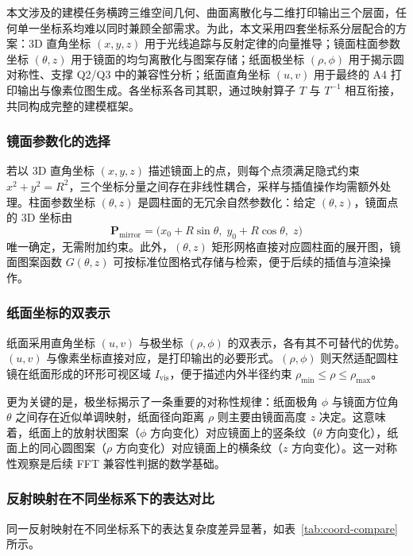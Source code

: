 \documentclass[12pt, a4paper]{ctexart}
\begin{document}
本文涉及的建模任务横跨三维空间几何、曲面离散化与二维打印输出三个层面，任何单一坐标系均难以同时兼顾全部需求。为此，本文采用四套坐标系分层配合的方案：3D 直角坐标 $(x,y,z)$ 用于光线追踪与反射定律的向量推导；镜面柱面参数坐标 $(\theta,z)$ 用于镜面的均匀离散化与图案存储；纸面极坐标 $(\rho,\phi)$ 用于揭示圆对称性、支撑 Q2/Q3 中的兼容性分析；纸面直角坐标 $(u,v)$ 用于最终的 A4 打印输出与像素位图生成。各坐标系各司其职，通过映射算子 $T$ 与 $T^{-1}$ 相互衔接，共同构成完整的建模框架。

\subsubsection{镜面参数化的选择}

若以 3D 直角坐标 $(x,y,z)$ 描述镜面上的点，则每个点须满足隐式约束 $x^2+y^2=R^2$，三个坐标分量之间存在非线性耦合，采样与插值操作均需额外处理。柱面参数坐标 $(\theta,z)$ 是圆柱面的无冗余自然参数化：给定 $(\theta,z)$，镜面点的 3D 坐标由
\[
\mathbf{P}_{\mathrm{mirror}}=\bigl(x_0+R\sin\theta,\;y_0+R\cos\theta,\;z\bigr)
\]
唯一确定，无需附加约束。此外，$(\theta,z)$ 矩形网格直接对应圆柱面的展开图，镜面图案函数 $G(\theta,z)$ 可按标准位图格式存储与检索，便于后续的插值与渲染操作。

\subsubsection{纸面坐标的双表示}

纸面采用直角坐标 $(u,v)$ 与极坐标 $(\rho,\phi)$ 的双表示，各有其不可替代的优势。$(u,v)$ 与像素坐标直接对应，是打印输出的必要形式。$(\rho,\phi)$ 则天然适配圆柱镜在纸面形成的环形可视区域 $I_{\mathrm{vis}}$，便于描述内外半径约束 $\rho_{\min}\leq\rho\leq\rho_{\max}$。

更为关键的是，极坐标揭示了一条重要的对称性规律：纸面极角 $\phi$ 与镜面方位角 $\theta$ 之间存在近似单调映射，纸面径向距离 $\rho$ 则主要由镜面高度 $z$ 决定。这意味着，纸面上的放射状图案（$\phi$ 方向变化）对应镜面上的竖条纹（$\theta$ 方向变化），纸面上的同心圆图案（$\rho$ 方向变化）对应镜面上的横条纹（$z$ 方向变化）。这一对称性观察是后续 FFT 兼容性判据的数学基础。

\subsubsection{反射映射在不同坐标系下的表达对比}

同一反射映射在不同坐标系下的表达复杂度差异显著，如表~\ref{tab:coord-compare} 所示。
\end{document}
